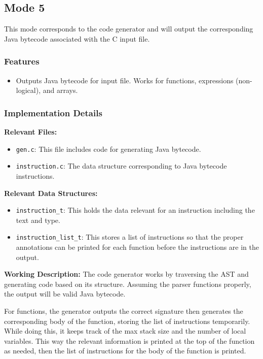 \subsection{Mode 5}
\label{sec:mode-5}

This mode corresponds to the code generator and will output the corresponding
Java bytecode associated with the C input file.

\subsubsection{Features}

\begin{itemize}
    \item Outputs Java bytecode for input file. Works for functions, expressions
    (non-logical), and arrays. 
\end{itemize}

\subsubsection{Implementation Details}

\textbf{Relevant Files:}

\begin{itemize}
    \item \verb|gen.c|: This file includes code for generating Java bytecode.
    \item \verb|instruction.c|: The data structure corresponding to Java
    bytecode instructions.
\end{itemize}

\noindent \textbf{Relevant Data Structures:}

\begin{itemize}
    \item \verb|instruction_t|: This holds the data relevant for an instruction
    including the text and type.
    \item \verb|instruction_list_t|: This stores a list of instructions so that
    the proper annotations can be printed for each function before the
    instructions are in the output. 
\end{itemize}

\noindent \textbf{Working Description:} The code generator works by traversing
the AST and generating code based on its structure. Assuming the parser
functions properly, the output will be valid Java bytecode.

For functions, the generator outputs the correct signature then generates the
corresponding body of the function, storing the list of instructions
temporarily. While doing this, it keeps track of the max stack size and the
number of local variables. This way the relevant information is printed at the
top of the function as needed, then the list of instructions for the body of the
function is printed.